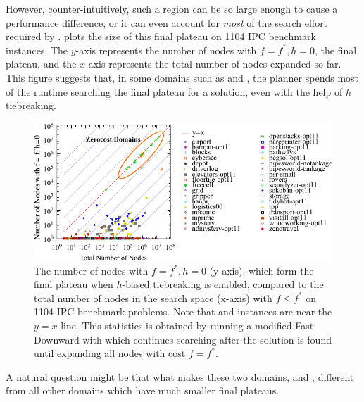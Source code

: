 However, counter-intuitively, such a region can be so large enough to
cause a performance difference, or it can even account for \emph{most} of the
search effort required by \astar.
 plots the size of this final plateau on 1104 IPC
benchmark instances.  The $y$-axis represents the number of nodes with
$f=f^*, h=0$, the final plateau, and the $x$-axis represents the total
number of nodes expanded so far. This figure suggests that, in some
domains such as  and , the planner
spends most of the runtime searching the final plateau for a solution,
even with the help of $h$ tiebreaking.

\begin{figure}[htbp]
   \centering
  \includegraphics{tables/aaai16-frontier/aaai16prelim3/lmcut_frontier-front.pdf}
  \caption{
 The number of nodes with $f=f^*, h=0$ (y-axis), which form
  the final plateau when $h$-based tiebreaking is enabled, compared to
  the total number of nodes in the search space (x-axis) with $f\leq
  f^*$ on 1104 IPC benchmark problems.  Note that 
  and  instances are near the $y=x$ line.
  This statistics is obtained by running a modified Fast Downward with
 \lmcut which continues searching after the solution is found
 until expanding all nodes with cost $f=f^*$.} \label{fig:plateau}
\end{figure}


A natural question might be that what makes these two domains,
 and , different from all other domains
which have much smaller final plateaus.
